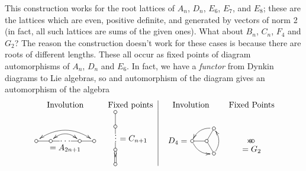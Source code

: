  This construction works for the root lattices of $A_n$, $D_n$, $E_6$, $E_7$, and
 $E_8$; these are the lattices which are even, positive definite, and generated by
 vectors of norm 2 (in fact, all such lattices are sums of the given ones). What about
 $B_n$, $C_n$, $F_4$ and $G_2$? The reason the construction doesn't work for these
 cases is because there are roots of different lengths. These all occur as fixed
 points of diagram automorphisms of $A_n$, $D_n$ and $E_6$. In fact, we have a
 \emph{functor}
 from Dynkin diagrams to Lie algebras, so and automorphism of the diagram gives an
 automorphism of the algebra
 \[\begin{tabular}{cc|cc}
  Involution & Fixed points & Involution & Fixed Points \\
  \begin{xy}<1.75em,0em>:
     (0,0)="1" *\cir<2pt>{};
     p+(1,0)="2"  *\cir<2pt>{} **@{-};
     p+(.6,0) **@{-};
     p+(.8,0) **{\hspace{.7pt}.\hspace{.7pt}};
     p+(.6,0)="22" *\cir<2pt>{} **@{-};
     p+(1,0)="11" *\cir<2pt>{} **@{-};
     "1" *+{\ };"11" *+{\ } **\crv{(2,1.5)} ?<*@{<} ?>*@{>},
     "2" *+{\ };"22" *+{\ } **\crv{(2,1)} ?<*@{<} ?>*@{>},
     (2,-.5) *{=A_{2n+1}}
   \end{xy} &
   \begin{xy}<1.75em,0em>:
   (0,2) *\cir<2pt>{};
   p-(0,1) *\cir<2pt>{} **@{-};
   p-(0,.5) **@{-};
   p-(0,.6) **+<-3.4pt,2pt>{.};
   p-(0,.5) *\cir<2pt>{} **@{-};
   p-(0,1) *\cir<2pt>{} **@{=}?(.5)*@{>};
  \end{xy} $= C_{n+1}$ &
  \begin{xy}<1.75em,0em>:
     (0,0) *\cir<2pt>{};
     a(60)="1" *\cir<2pt>{} **@{-},
     a(180)="2" *++!R{D_4=} *\cir<2pt>{} **@{-},
     a(-60)="3" *\cir<2pt>{} **@{-},
     \ar@/_1.4ex/ "1" *+{\ };"2" *+{\ }
     \ar@/_1.4ex/ "2" *+{\ };"3" *+{\ }
     \ar@/_1.4ex/ "3" *+{\ };"1" *+{\ }
   \end{xy} &
   \begin{xy}
   (.5,0) *++!U{=G_2};
   (0,0)="1" *\cir<2pt>{};
   (1,0)="2" *\cir<2pt>{} **@{-}?*@{>},
   \ar@{-} "1" *{\hspace{3pt}};"2" *{\hspace{3pt}} <1.5pt>
   \ar@{-} "1" *{\hspace{3pt}};"2" *{\hspace{3pt}} <-1.5pt>
   \end{xy}\\
   \begin{xy}<1.75em,0em>:

\end{xy}
\end{tabular}\]
